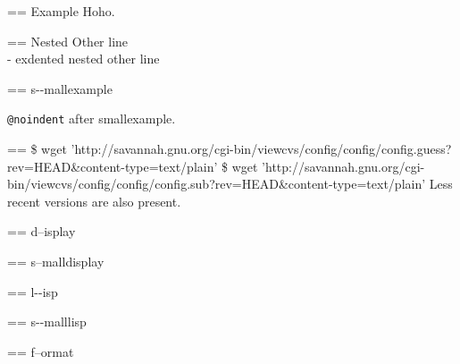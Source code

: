 \documentclass{book}
\makeatletter
\newenvironment{Texinfopreformatted}{%
  \par\GNUTobeylines\obeyspaces\frenchspacing\parskip=\z@\parindent=\z@}{}
{\catcode`\^^M=13 \gdef\GNUTobeylines{\catcode`\^^M=13 \def^^M{\null\par}}}
\newenvironment{Texinfoindented}{\begin{list}{}{}\item\relax}{\end{list}}
\renewcommand{\_}{\Texinfounderscore\discretionary{}{}{}}
\makeatother
\begin{document}
\begin{titlepage}
\begin{Texinfoindented}
\begin{Texinfopreformatted}%
\ttfamily Example   Hoho.
\end{Texinfopreformatted}
\begin{Texinfoindented}
\begin{Texinfopreformatted}%
\ttfamily Nested Other line
\end{Texinfopreformatted}
\leavevmode{}\\
\hbox{\kern -\leftmargin}%
exdented nested other line
\\
\end{Texinfoindented}
\end{Texinfoindented}

\begin{Texinfopreformatted}%
\ttfamily \footnotesize s{-}{-}mallexample
\end{Texinfopreformatted}

\texttt{@noindent} after smallexample.
\begin{Texinfopreformatted}%
\ttfamily \footnotesize \$ wget 'http://savannah.gnu.org/cgi-bin/viewcvs/config/config/config.guess?rev=HEAD\&content-type=text/plain'
\$ wget 'http://savannah.gnu.org/cgi-bin/viewcvs/config/config/config.sub?rev=HEAD\&content-type=text/plain'
\end{Texinfopreformatted}
\noindent{}Less recent versions are also present.

\begin{Texinfoindented}
\begin{Texinfopreformatted}%
d--isplay
\end{Texinfopreformatted}
\end{Texinfoindented}

\begin{Texinfopreformatted}%
\footnotesize s--malldisplay
\end{Texinfopreformatted}

\begin{Texinfoindented}
\begin{Texinfopreformatted}%
\ttfamily l{-}{-}isp
\end{Texinfopreformatted}
\end{Texinfoindented}

\begin{Texinfopreformatted}%
\ttfamily \footnotesize s{-}{-}malllisp
\end{Texinfopreformatted}

\begin{Texinfopreformatted}%
f--ormat
\end{Texinfopreformatted}


\end{titlepage}
\end{document}
